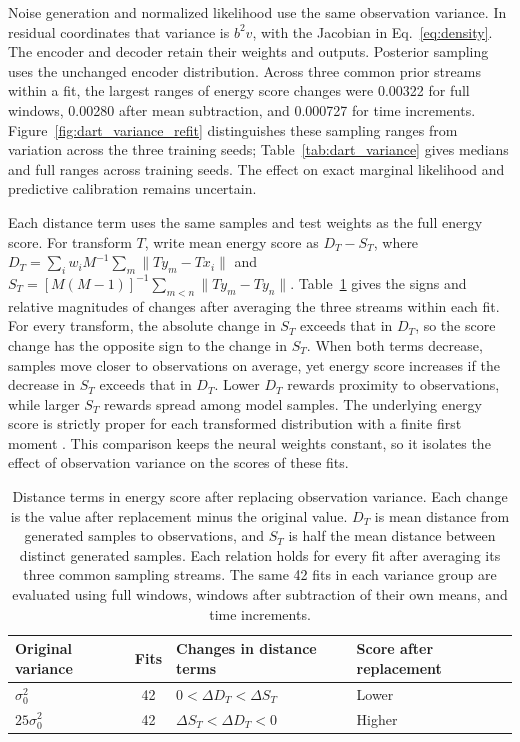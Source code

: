 \documentclass{article}
\begin{document}
Noise generation and normalized likelihood use the same observation variance. In residual coordinates that variance is $b^2\hat v$, with the Jacobian in Eq.~\ref{eq:density}. The encoder and decoder retain their weights and outputs. Posterior sampling uses the unchanged encoder distribution. Across three common prior streams within a fit, the largest ranges of energy score changes were 0.00322 for full windows, 0.00280 after mean subtraction, and 0.000727 for time increments. Figure~\ref{fig:dart_variance_refit} distinguishes these sampling ranges from variation across the three training seeds; Table~\ref{tab:dart_variance} gives medians and full ranges across training seeds. The effect on exact marginal likelihood and predictive calibration remains uncertain.

Each distance term uses the same samples and test weights as the full energy score. For transform $T$, write mean energy score as $D_T-S_T$, where $D_T=\sum_i w_i M^{-1}\sum_m\|Ty_m-Tx_i\|$ and $S_T=[M(M-1)]^{-1}\sum_{m<n}\|Ty_m-Ty_n\|$. Table~\ref{tab:dart_energy_terms} gives the signs and relative magnitudes of changes after averaging the three streams within each fit. For every transform, the absolute change in $S_T$ exceeds that in $D_T$, so the score change has the opposite sign to the change in $S_T$. When both terms decrease, samples move closer to observations on average, yet energy score increases if the decrease in $S_T$ exceeds that in $D_T$. Lower $D_T$ rewards proximity to observations, while larger $S_T$ rewards spread among model samples. The underlying energy score is strictly proper for each transformed distribution with a finite first moment \citep{GneitingRaftery2007ProperScoringRules}. This comparison keeps the neural weights constant, so it isolates the effect of observation variance on the scores of these fits.

\clearpage
\begin{table}[H]
\centering
\caption{Distance terms in energy score after replacing observation variance. Each change is the value after replacement minus the original value. $D_T$ is mean distance from generated samples to observations, and $S_T$ is half the mean distance between distinct generated samples. Each relation holds for every fit after averaging its three common sampling streams. The same 42 fits in each variance group are evaluated using full windows, windows after subtraction of their own means, and time increments.}
\label{tab:dart_energy_terms}
\begin{tabular}{lcll}
\toprule
Original variance & Fits & Changes in distance terms & Score after replacement\\
\midrule
$\sigma_0^2$ & 42 & $0<\Delta D_T<\Delta S_T$ & Lower\\
$25\sigma_0^2$ & 42 & $\Delta S_T<\Delta D_T<0$ & Higher\\
\bottomrule
\end{tabular}
\end{table}
\end{document}
